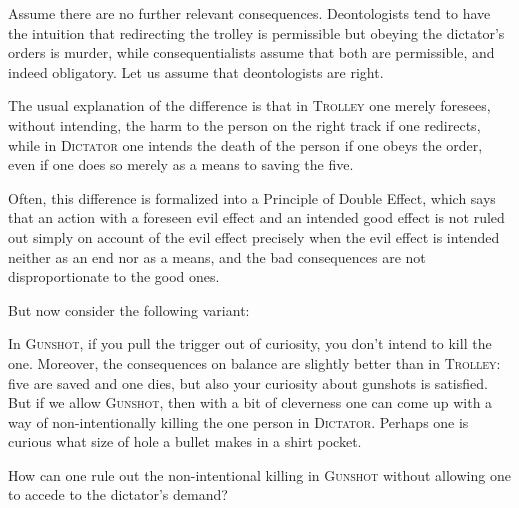     
Assume there are no further relevant consequences.  Deontologists tend to have the intuition that redirecting 
the trolley is permissible but obeying the dictator's orders is murder, while consequentialists assume 
that both are permissible, and indeed obligatory. Let us assume that deontologists are right.

The usual explanation of the difference is that in \textsc{Trolley} one merely foresees, without intending, the 
harm to the person on the right track if one redirects, while in \textsc{Dictator} one intends the death of the person
if one obeys the order, even if one does so merely as a means to saving the five. 

Often, this difference is formalized into a Principle of Double Effect, which says that an action with a foreseen
evil effect and an intended good effect is not ruled out simply on account of the evil effect precisely when 
the evil effect is intended neither as an end nor as a means, and the bad consequences are not disproportionate to the good ones.

But now consider the following variant:

In \textsc{Gunshot}, if you pull the trigger out of curiosity, you don't intend to kill the one. Moreover, the consequences
on balance are slightly better than in \textsc{Trolley}: five are saved and one dies, but also your curiosity about gunshots is
satisfied. But if we allow \textsc{Gunshot}, then with a bit of cleverness one can come up with a way of non-intentionally
killing the one person in \textsc{Dictator}. Perhaps one is curious what size of hole a bullet makes in a shirt pocket. 

How can one rule out the non-intentional killing in \textsc{Gunshot} without allowing one to accede to the dictator's demand? 

